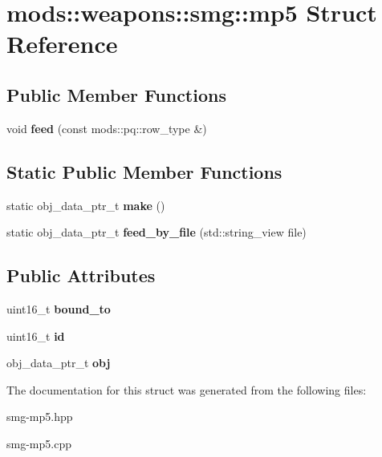 \hypertarget{structmods_1_1weapons_1_1smg_1_1mp5}{}\section{mods\+:\+:weapons\+:\+:smg\+:\+:mp5 Struct Reference}
\label{structmods_1_1weapons_1_1smg_1_1mp5}
\subsection*{Public Member Functions}
\begin{DoxyCompactItemize}
\item 
\mbox{\label{structmods_1_1weapons_1_1smg_1_1mp5_a7f6e47dc90e084b24015eab768918020}} 
void {\bfseries feed} (const mods\+::pq\+::row\+\_\+type \&)
\end{DoxyCompactItemize}
\subsection*{Static Public Member Functions}
\begin{DoxyCompactItemize}
\item 
\mbox{\label{structmods_1_1weapons_1_1smg_1_1mp5_acafdc79285fe77ba065ab3229cd98e0a}} 
static obj\+\_\+data\+\_\+ptr\+\_\+t {\bfseries make} ()
\item 
\mbox{\label{structmods_1_1weapons_1_1smg_1_1mp5_ad5f41fa995796881bbafeea08dffefcf}} 
static obj\+\_\+data\+\_\+ptr\+\_\+t {\bfseries feed\+\_\+by\+\_\+file} (std\+::string\+\_\+view file)
\end{DoxyCompactItemize}
\subsection*{Public Attributes}
\begin{DoxyCompactItemize}
\item 
\mbox{\label{structmods_1_1weapons_1_1smg_1_1mp5_a6ef75389689196900fde8e829e1164ad}} 
uint16\+\_\+t {\bfseries bound\+\_\+to}
\item 
\mbox{\label{structmods_1_1weapons_1_1smg_1_1mp5_af71a1081e98e6f934288395e3cecef45}} 
uint16\+\_\+t {\bfseries id}
\item 
\mbox{\label{structmods_1_1weapons_1_1smg_1_1mp5_a7f8b190fb5626c3d55fc9d736319c10a}} 
obj\+\_\+data\+\_\+ptr\+\_\+t {\bfseries obj}
\end{DoxyCompactItemize}


The documentation for this struct was generated from the following files\+:\begin{DoxyCompactItemize}
\item 
smg-\/mp5.\+hpp\item 
smg-\/mp5.\+cpp\end{DoxyCompactItemize}
